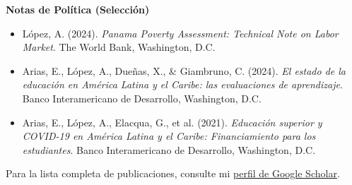 \documentclass[10pt]{article}
\newenvironment{cvitems}{%
  \begin{itemize}[
    leftmargin=1.2em,
    itemsep=0pt,
    parsep=0pt,
    topsep=1pt,
    label={$\bullet$}]%
}{\end{itemize}}
\begin{document}
\vspace{3pt}
\textbf{Notas de Pol\'itica (Selecci\'on)}
\begin{cvitems}
  \item L\'opez, A. (2024). \textit{Panama Poverty Assessment: Technical Note on Labor Market}. The World Bank, Washington, D.C.
  \item Arias, E., L\'opez, A., Due\~nas, X., \& Giambruno, C. (2024). \textit{El estado de la educaci\'on en Am\'erica Latina y el Caribe: las evaluaciones de aprendizaje}. Banco Interamericano de Desarrollo, Washington, D.C.
  \item Arias, E., L\'opez, A., Elacqua, G., et al. (2021). \textit{Educaci\'on superior y COVID-19 en Am\'erica Latina y el Caribe: Financiamiento para los estudiantes}. Banco Interamericano de Desarrollo, Washington, D.C.
\end{cvitems}

\vspace{2pt}
Para la lista completa de publicaciones, consulte mi \href{https://scholar.google.com/citations?user=wfO9incAAAAJ&hl=en}{perfil de Google Scholar}.

\end{document}
